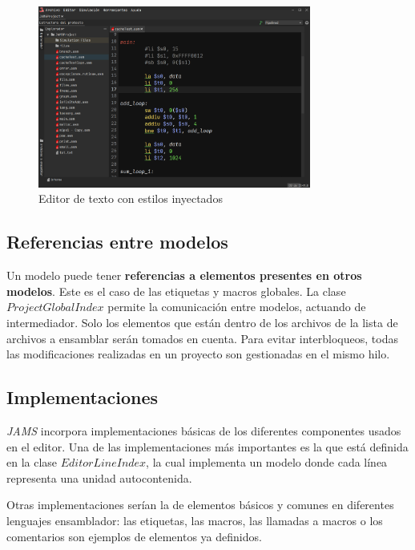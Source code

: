 \begin{figure}[H]
    \centering
    \includegraphics[width=0.8\textwidth]{images/base/jams-text-editor}
    \caption{Editor de texto con estilos inyectados}
    \label{fig:jams-editor-texto}
\end{figure}

\subsection{Referencias entre modelos}\label{subsec:referencias-entre-modelos}

Un modelo puede tener \textbf{referencias a elementos
presentes en otros modelos}.
Este es el caso de las etiquetas y macros globales.
La clase $ProjectGlobalIndex$ permite la
comunicación entre modelos, actuando de intermediador.
Solo los elementos que están dentro de los archivos
de la lista de archivos a ensamblar serán tomados en cuenta.
Para evitar interbloqueos, todas las modificaciones
realizadas en un proyecto son gestionadas en el
mismo hilo.

\subsection{Implementaciones}\label{subsec:implementaciones}

\textit{JAMS} incorpora implementaciones básicas de los
diferentes componentes usados en el editor.
Una de las implementaciones más importantes es la que está
definida en la clase $EditorLineIndex$, la cual
implementa un modelo donde cada línea representa una
unidad autocontenida.

\noindent Otras implementaciones serían la de elementos
básicos y comunes en diferentes lenguajes ensamblador:
las etiquetas, las macros, las llamadas a macros o
los comentarios son ejemplos de elementos ya definidos.

